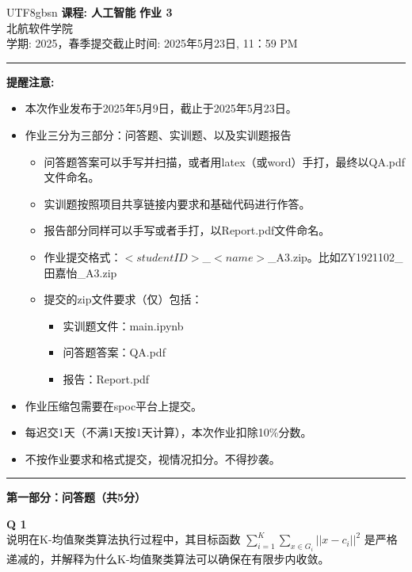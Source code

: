 \documentclass[a4paper, 11pt]{article}
\newenvironment{problem}[2][Q]
    { \begin{mdframed}[backgroundcolor=gray!20] \textbf{#1 #2} \\}
    {  \end{mdframed}}
\begin{document}
\begin{CJK}{UTF8}{gbsn}
\noindent
\large\textbf{课程: 人工智能} \hfill \textbf{作业 3}   \\
北航软件学院 \\
\normalsize 学期: 2025，春季\hfill 提交截止时间:  2025年5月23日, 11：59 PM \\
\noindent\rule{7in}{2.8pt}
\textbf{提醒注意:}
\begin{itemize}
\item 本次作业发布于2025年5月9日，截止于2025年5月23日。
\item 作业三分为三部分：问答题、实训题、以及实训题报告
\begin{itemize}
    \item 问答题答案可以手写并扫描，或者用latex（或word）手打，最终以QA.pdf文件命名。
    \item 实训题按照项目共享链接内要求和基础代码进行作答。
    \item 报告部分同样可以手写或者手打，以Report.pdf文件命名。
    \item 作业提交格式：$<student ID>$\_$<name>$\_A3.zip。比如ZY1921102\_田嘉怡\_A3.zip
    \item 提交的zip文件要求（仅）包括：
    \begin{itemize}
        \item 实训题文件：main.ipynb
        \item 问答题答案：QA.pdf
        \item 报告：Report.pdf
    \end{itemize}
    
\end{itemize}
\item 作业压缩包需要在spoc平台上提交。
\item 每迟交1天（不满1天按1天计算），本次作业扣除10\%分数。
\item 不按作业要求和格式提交，视情况扣分。不得抄袭。
\end{itemize}

\noindent\rule{7in}{1pt}
\textbf{第一部分：问答题（共5分）}


\begin{problem}{1}
说明在K-均值聚类算法执行过程中，其目标函数 $\sum_{i=1}^{K} \sum_{x\in G_i}||x-c_i||^2$ 是严格递减的，并解释为什么K-均值聚类算法可以确保在有限步内收敛。
\end{problem}


\end{CJK}
\end{document}
